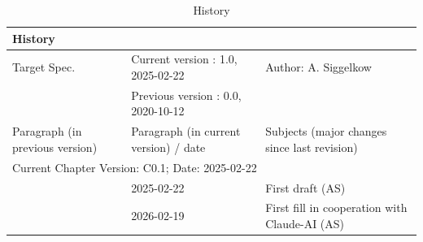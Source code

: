\begin{table}[H]
\caption{History}
\label{tab:arch_history02}
\centering
\begin{tabularx}{\textwidth}{|X |X |X |}
  \hline
  \multicolumn{3}{|l|}{History} \\
  \hline
  \multicolumn{1}{|l}{Target Spec.} & \multicolumn{1}{l}{Current version : 1.0, 2025-02-22} & \multicolumn{1}{l|}{Author: A. Siggelkow}\\
  \multicolumn{1}{|l}{ } & \multicolumn{1}{l}{Previous version : 0.0, 2020-10-12} & \multicolumn{1}{l|}{ }\\
  \hline
  \hline
  Paragraph (in previous version) & Paragraph (in current version) / date & Subjects (major changes since last revision) \\
  \hline
  \hline
  \multicolumn{3}{|l|}{Current Chapter Version: C0.1; Date: 2025-02-22} \\
  \hline
  & 2025-02-22 & First draft (AS) \\
  & 2026-02-19 & First fill in cooperation with Claude-AI (AS) \\
  \hline
\end{tabularx}
\end{table}
